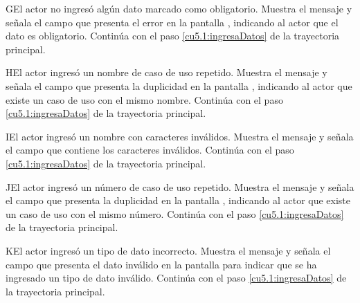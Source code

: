  \begin{UCtrayectoriaA}{G}{El actor no ingresó algún dato marcado como obligatorio.}
    \UCpaso[\UCsist] Muestra el mensaje  y señala el campo que presenta el error en la pantalla 
	    , indicando al actor que el dato es obligatorio.
    \UCpaso[] Continúa con el paso \ref{cu5.1:ingresaDatos} de la trayectoria principal.
 \end{UCtrayectoriaA}
 \begin{UCtrayectoriaA}{H}{El actor ingresó un nombre de caso de uso repetido.}
    \UCpaso[\UCsist] Muestra el mensaje  y señala el campo que presenta la duplicidad en la pantalla 
	    , indicando al actor que existe un caso de uso con el mismo nombre.
    \UCpaso[] Continúa con el paso \ref{cu5.1:ingresaDatos} de la trayectoria principal.
 \end{UCtrayectoriaA}
 \begin{UCtrayectoriaA}{I}{El actor ingresó un nombre con caracteres inválidos.}
    \UCpaso[\UCsist] Muestra el mensaje  y señala el campo que contiene los caracteres inválidos.
    \UCpaso[] Continúa con el paso \ref{cu5.1:ingresaDatos} de la trayectoria principal.
 \end{UCtrayectoriaA}
 \begin{UCtrayectoriaA}{J}{El actor ingresó un número de caso de uso repetido.}
    \UCpaso[\UCsist] Muestra el mensaje  y señala el campo que presenta la duplicidad en la pantalla 
	    , indicando al actor que existe un caso de uso con el mismo número.
    \UCpaso[] Continúa con el paso \ref{cu5.1:ingresaDatos} de la trayectoria principal.
 \end{UCtrayectoriaA}
 \begin{UCtrayectoriaA}{K}{El actor ingresó un tipo de dato incorrecto.}
    \UCpaso[\UCsist] Muestra el mensaje  y señala el campo que presenta el dato inválido en la 
    pantalla  para indicar que se ha ingresado un tipo de dato inválido.
    \UCpaso[] Continúa con el paso \ref{cu5.1:ingresaDatos} de la trayectoria principal.
 \end{UCtrayectoriaA}
